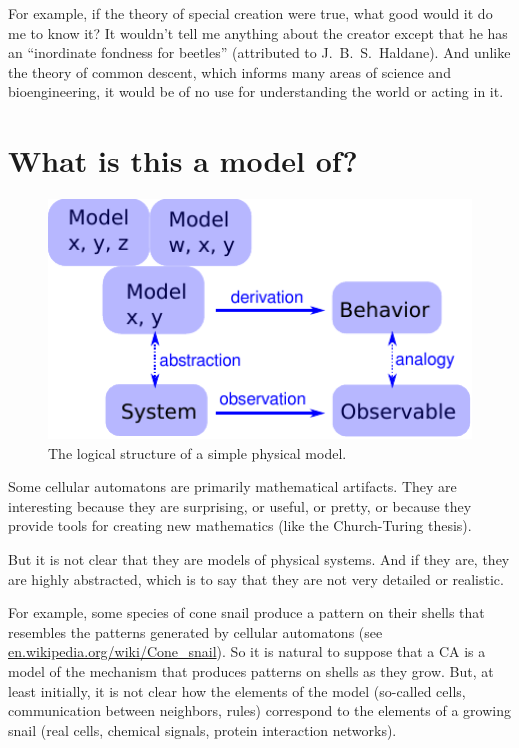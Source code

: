 \documentclass[12pt]{book}
\theoremstyle{exercise}
\begin{document}

For example, if the theory of special creation were true, what good
would it do me to know it?  It wouldn't tell me anything about the
creator except that he has an ``inordinate fondness for beetles''
(attributed to J.~B.~S.~Haldane).  And unlike the
theory of common descent, which informs many areas of science
and bioengineering, it would be of no use for understanding
the world or acting in it.



\section{What is this a model of?}
\label{model3}

\begin{figure}
\centerline{\includegraphics[height=2.5in]{figs/model3.pdf}}
\caption{The logical structure of a simple physical model.}
\label{fig.model3}
\end{figure}

Some cellular automatons are primarily mathematical artifacts.  They are
interesting because they are surprising, or useful, or pretty, or
because they provide tools for creating new mathematics (like the
Church-Turing thesis).


But it is not clear that they are models of physical systems.  And if
they are, they are highly abstracted, which is to say that they are
not very detailed or realistic.


For example, some species of cone snail produce a pattern on their
shells that resembles the patterns generated by cellular automatons
(see \url{en.wikipedia.org/wiki/Cone_snail}).  So it is natural to
suppose that a CA is a model of the mechanism that produces patterns
on shells as they grow.  But, at least initially, it is not clear how
the elements of the model (so-called cells, communication between
neighbors, rules) correspond to the elements of a growing snail (real
cells, chemical signals, protein interaction networks).
\end{document}
